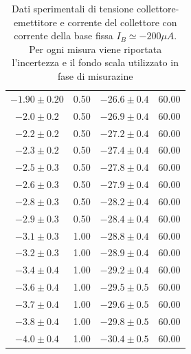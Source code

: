 \documentclass[a4paper,11pt]{article}
\begin{document}
\begin{table}[h!]
\begin{center}
\begin{tabular}{c|c|c|c}
      $ -1.90 \pm 0.20 $    & 0.50                    & $ -26.6 \pm 0.4 $     & 60.00                \\
      $ -2.0 \pm 0.2 $      & 0.50                    & $ -26.9 \pm 0.4 $     & 60.00                \\
      $ -2.2 \pm 0.2 $      & 0.50                    & $ -27.2 \pm 0.4 $     & 60.00                \\
      $ -2.3 \pm 0.2 $      & 0.50                    & $ -27.4 \pm 0.4 $     & 60.00                \\
      $ -2.5 \pm 0.3 $      & 0.50                    & $ -27.8 \pm 0.4 $     & 60.00                \\
      $ -2.6 \pm 0.3 $      & 0.50                    & $ -27.9 \pm 0.4 $     & 60.00                \\
      $ -2.8 \pm 0.3 $      & 0.50                    & $ -28.2 \pm 0.4 $     & 60.00                \\
      $ -2.9 \pm 0.3 $      & 0.50                    & $ -28.4 \pm 0.4 $     & 60.00                \\
      $ -3.1 \pm 0.3 $      & 1.00                    & $ -28.8 \pm 0.4 $     & 60.00                \\
      $ -3.2 \pm 0.3 $      & 1.00                    & $ -28.9 \pm 0.4 $     & 60.00                \\
      $ -3.4 \pm 0.4 $      & 1.00                    & $ -29.2 \pm 0.4 $     & 60.00                \\
      $ -3.6 \pm 0.4 $      & 1.00                    & $ -29.5 \pm 0.5 $     & 60.00                \\
      $ -3.7 \pm 0.4 $      & 1.00                    & $ -29.6 \pm 0.5 $     & 60.00                \\
      $ -3.8 \pm 0.4 $      & 1.00                    & $ -29.8 \pm 0.5 $     & 60.00                \\
      $ -4.0 \pm 0.4 $      & 1.00                    & $ -30.4 \pm 0.5 $     & 60.00                \\
    \end{tabular}
    \caption{Dati sperimentali di tensione collettore-emettitore e corrente del collettore con corrente della base fissa $I_B \simeq -200 \mu A$. Per ogni misura viene riportata l'incertezza e il fondo scala utilizzato in fase di misurazine }
  \end{center}
\end{table}
\end{document}
